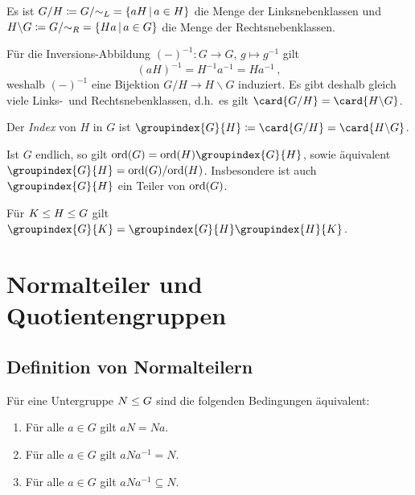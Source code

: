 \begin{definition}
  Es ist $G/H \defined G/{\sim_L} = \{aH \suchthat a \in H\}$ die Menge der Linksnebenklassen und $H \backslash G \defined G/{\sim_R} = \{Ha \suchthat a \in G\}$ die Menge der Rechtsnebenklassen.
\end{definition}

Für die Inversions-Abbildung $(-)^{-1} \colon G \to G$, $g \mapsto g^{-1}$ gilt
\[
    (aH)^{-1}
  = H^{-1} a^{-1}
  = H a^{-1} \,,
\]
weshalb $(-)^{-1}$ eine Bijektion $G/H \to H \backslash G$ induziert.
Es gibt deshalb gleich viele Links-\ und Rechtsnebenklassen, d.h.\ es gilt $\card{G/H} = \card{H \backslash G}$.

\begin{definition}
  Der \emph{Index} von $H$ in $G$ ist $\groupindex{G}{H} \defined \card{G/H} = \card{H \backslash G}$.
\end{definition}

\begin{corollary}
  Ist $G$ endlich, so gilt $\ord{G} = \ord{H} \groupindex{G}{H}$, sowie äquivalent $\groupindex{G}{H} = \ord{G}/{\ord{H}}$.
  Insbesondere ist auch $\groupindex{G}{H}$ ein Teiler von $\operatorname{ord}(G)$.
\end{corollary}

\begin{lemma}
  Für $K \mathrel{\leq} H \mathrel{\leq} G$ gilt $\groupindex{G}{K} = \groupindex{G}{H} \groupindex{H}{K}$.
\end{lemma}






\section{Normalteiler und Quotientengruppen}



\subsection{Definition von Normalteilern}

Für eine Untergruppe $N \mathrel{\leq} G$ sind die folgenden Bedingungen äquivalent:

\begin{enumerate}
  \item
    Für alle $a \in G$ gilt $aN = Na$.
  \item
    Für alle $a \in G$ gilt $aNa^{-1} = N$.
  \item
    Für alle $a \in G$ gilt $aNa^{-1} \subseteq N$.
\end{enumerate}

